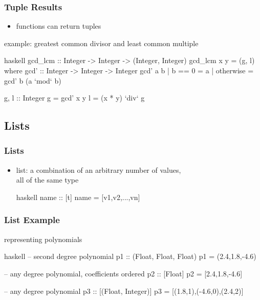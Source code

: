\documentclass[dvipsnames]{beamer}
\theoremstyle{plain}
\begin{document}
\begin{frame}[fragile]
  \frametitle{Tuple Results}

  \begin{itemize}
    \item functions can return tuples
  \end{itemize}

  \begin{exampleblock}{example: greatest common divisor
                            and least common multiple}
    \begin{pygments}{haskell}
gcd_lcm :: Integer -> Integer -> (Integer, Integer)
gcd_lcm x y = (g, l)
  where
    gcd' :: Integer -> Integer -> Integer
    gcd' a b
      | b == 0    = a
      | otherwise = gcd' b (a `mod` b)

    g, l :: Integer
    g = gcd' x y
    l = (x * y) `div` g
    \end{pygments}
  \end{exampleblock}
\end{frame}

\subsection{Lists}

\begin{frame}[fragile]
  \frametitle{Lists}

  \begin{itemize}
    \item \alert{list}: a combination of an arbitrary number of values,\\
      all of the same type
    \begin{block}{}
      \begin{pygments}{haskell}
name :: [t]
name = [v1,v2,...,vn]
      \end{pygments}
    \end{block}
  \end{itemize}
\end{frame}

\begin{frame}[fragile]
  \frametitle{List Example}

  \begin{exampleblock}{representing polynomials}
    \begin{pygments}{haskell}
-- second degree polynomial
p1 :: (Float, Float, Float)
p1 = (2.4,1.8,-4.6)

-- any degree polynomial, coefficients ordered
p2 :: [Float]
p2 = [2.4,1.8,-4.6]

-- any degree polynomial
p3 :: [(Float, Integer)]
p3 = [(1.8,1),(-4.6,0),(2.4,2)]
    \end{pygments}
  \end{exampleblock}
\end{frame}
\end{document}
